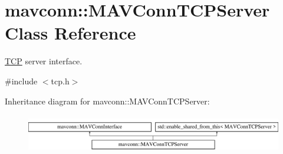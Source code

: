 \hypertarget{classmavconn_1_1MAVConnTCPServer}{}\section{mavconn\+::M\+A\+V\+Conn\+T\+C\+P\+Server Class Reference}
\label{classmavconn_1_1MAVConnTCPServer}


\mbox{\hyperlink{classTCP}{T\+CP}} server interface.  




{\ttfamily \#include $<$tcp.\+h$>$}

Inheritance diagram for mavconn\+::M\+A\+V\+Conn\+T\+C\+P\+Server\+:\begin{figure}[H]
\begin{center}
\leavevmode
\includegraphics[height=1.696970cm]{classmavconn_1_1MAVConnTCPServer}
\end{center}
\end{figure}
